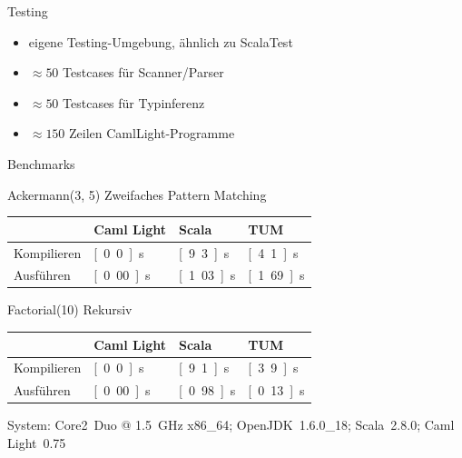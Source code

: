 \documentclass[hyperref={pdfpagelabels=false}]{beamer}
\begin{document}
\begin{frame}{Testing}
  \begin{itemize}
    \item eigene Testing-Umgebung, ähnlich zu ScalaTest
    \item $\approx 50$ Testcases für Scanner/Parser
    \item $\approx 50$ Testcases für Typinferenz
    \item $\approx 150$ Zeilen CamlLight-Programme
  \end{itemize}
\end{frame}

\begin{frame}{Benchmarks}
  \begin{block}{Ackermann(3, 5)}
    Zweifaches Pattern Matching

    \begin{tabular}{l|l|l|l}
       & Caml Light & Scala & TUM \\
      \hline
      Kompilieren & \textcolor{fastest}{\unit[0.0]{s}} & \textcolor{slowest}{\unit[9.3]{s}} & \unit[4.1]{s} \\
      Ausführen & \textcolor{fastest}{\unit[0.00]{s}} & \unit[1.03]{s} & \textcolor{slowest}{\unit[1.69]{s}} \\
    \end{tabular}
  \end{block}
  \begin{block}{Factorial(10)}
    Rekursiv

    \begin{tabular}{l|l|l|l}
       & Caml Light & Scala & TUM \\
      \hline
      Kompilieren & \textcolor{fastest}{\unit[0.0]{s}} & \textcolor{slowest}{\unit[9.1]{s}} & \unit[3.9]{s} \\
      Ausführen & \textcolor{fastest}{\unit[0.00]{s}} & \textcolor{slowest}{\unit[0.98]{s}} & \unit[0.13]{s} \\
    \end{tabular}
  \end{block}
  System: Core2~Duo @ 1.5~GHz x86\_64; OpenJDK~1.6.0\_18; Scala~2.8.0; Caml Light~0.75
\end{frame}
\end{document}
